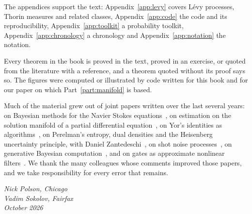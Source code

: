 The appendices support the text: Appendix~\ref{app:levy} covers L\'evy processes, Thorin measures and related classes, Appendix~\ref{app:code} the code and its reproducibility, Appendix~\ref{app:toolkit} a probability toolkit, Appendix~\ref{app:chronology} a chronology and Appendix~\ref{app:notation} the notation.

Every theorem in the book is proved in the text, proved in an exercise, or quoted from the literature with a reference, and a theorem quoted without its proof says so. The figures were computed or illustrated by code written for this book and for our paper on which Part~\ref{part:manifold} is based.

Much of the material grew out of joint papers written over the last several years: on Bayesian methods for the Navier Stokes equations~\cite{polsonsokolov2026ns}, on estimation on the solution manifold of a partial differential equation~\cite{polsonsokolov2026manifold}, on Yor's identities as algorithms~\cite{polsonsokolovyor}, on Perelman's entropy, dual densities and the Heisenberg uncertainty principle, with Daniel Zantedeschi~\cite{polsonsokolovperelman}, on shot noise processes~\cite{polsonsokolov2026gbcshot}, on generative Bayesian computation~\cite{polsonsokolov2025}, and on gates as approximate nonlinear filters~\cite{polsonsokolov2026gates}. We thank the many colleagues whose comments improved those papers, and we take responsibility for every error that remains.

\medskip
\noindent\textit{Nick Polson, Chicago}\\
\textit{Vadim Sokolov, Fairfax}\\
\textit{October 2026}
